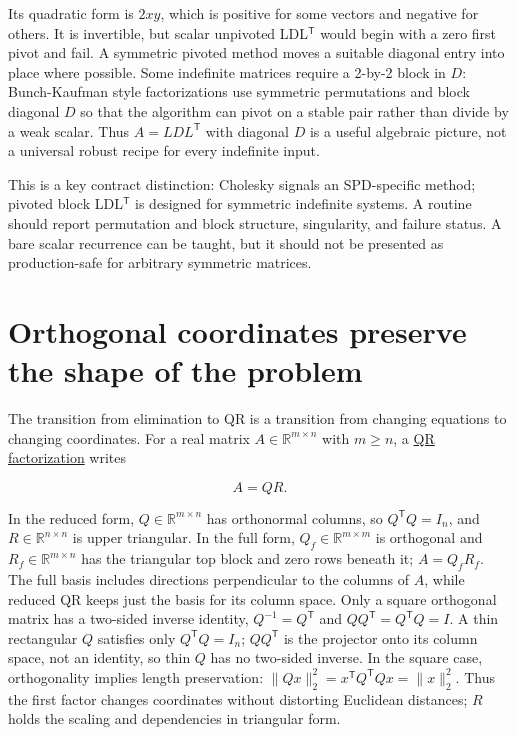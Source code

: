 Its quadratic form is \(2xy\), which is positive for some vectors and negative for others. It is invertible, but scalar unpivoted LDL\(^\mathsf T\) would begin with a zero first pivot and fail. A symmetric pivoted method moves a suitable diagonal entry into place where possible. Some indefinite matrices require a 2-by-2 block in \(D\): Bunch-Kaufman style factorizations use symmetric permutations and block diagonal \(D\) so that the algorithm can pivot on a stable pair rather than divide by a weak scalar. Thus \(A=LDL^\mathsf T\) with diagonal \(D\) is a useful algebraic picture, not a universal robust recipe for every indefinite input.

This is a key contract distinction: Cholesky signals an SPD-specific method; pivoted block LDL\(^\mathsf T\) is designed for symmetric indefinite systems. A routine should report permutation and block structure, singularity, and failure status. A bare scalar recurrence can be taught, but it should not be presented as production-safe for arbitrary symmetric matrices.

\section{Orthogonal coordinates preserve the shape of the problem}\label{01-foundations-i-ch020-orthogonal-coordinates-preserve-the-shape-of-the-problem}

\hypertarget{01-foundations-i-ch020-orthogonal-coordinates-preserve-the-shape-of-the-problem}{}

The transition from elimination to QR is a transition from changing equations to changing coordinates. For a real matrix \(A\in\mathbb R^{m\times n}\) with \(m\ge n\), a \hyperref[01-foundations-i-ch020-reflections-and-plane-rotations-build-qr-without-losing-lengths]{QR factorization} writes

\[
A=QR.
\]

In the reduced form, \(Q\in\mathbb R^{m\times n}\) has orthonormal columns, so \(Q^\mathsf TQ=I_n\), and \(R\in\mathbb R^{n\times n}\) is upper triangular. In the full form, \(Q_f\in\mathbb R^{m\times m}\) is orthogonal and \(R_f\in\mathbb R^{m\times n}\) has the triangular top block and zero rows beneath it; \(A=Q_fR_f\). The full basis includes directions perpendicular to the columns of \(A\), while reduced QR keeps just the basis for its column space. Only a square orthogonal matrix has a two-sided inverse identity, \(Q^{-1}=Q^\mathsf T\) and \(QQ^\mathsf T=Q^\mathsf TQ=I\). A thin rectangular \(Q\) satisfies only \(Q^\mathsf TQ=I_n\); \(QQ^\mathsf T\) is the projector onto its column space, not an identity, so thin \(Q\) has no two-sided inverse. In the square case, orthogonality implies length preservation: \(\|Qx\|_2^2=x^\mathsf TQ^\mathsf TQx=\|x\|_2^2\). Thus the first factor changes coordinates without distorting Euclidean distances; \(R\) holds the scaling and dependencies in triangular form.

